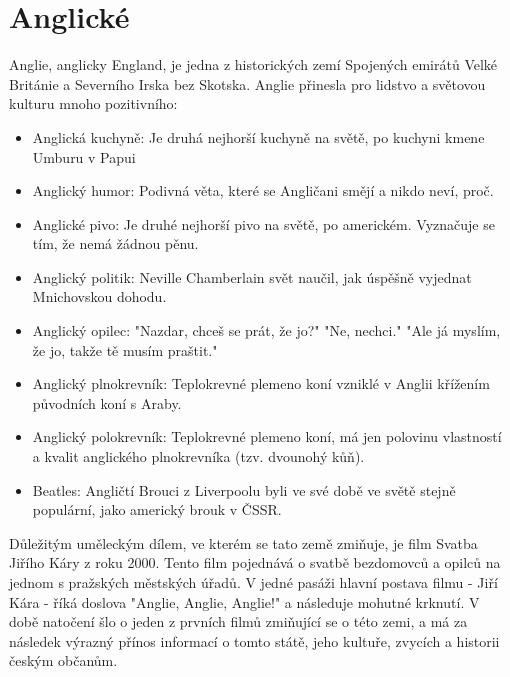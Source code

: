\documentclass[10.5pt]{book}
\begin{document}
\section{Anglické}

Anglie, anglicky England, je jedna z historických zemí Spojených emirátů Velké
Británie a Severního Irska bez Skotska. Anglie přinesla pro lidstvo a světovou
kulturu mnoho pozitivního: 
\begin{itemize}
	\item Anglická kuchyně: Je druhá nejhorší kuchyně na světě, po kuchyni kmene
	Umburu v Papui
	\item Anglický humor: Podivná věta, které se Angličani smějí a nikdo neví,
	proč. 
	\item Anglické pivo: Je druhé nejhorší pivo na světě, po americkém. Vyznačuje
	se tím, že nemá žádnou pěnu. 
	\item Anglický politik: Neville Chamberlain svět naučil, jak úspěšně vyjednat
	Mnichovskou dohodu. 
	\item Anglický opilec: "Nazdar, chceš se prát, že jo?" "Ne, nechci."
	"Ale já myslím, že jo, takže tě musím praštit."
	\item Anglický plnokrevník: Teplokrevné plemeno koní vzniklé v Anglii křížením
	původních koní s Araby. 
	\item Anglický polokrevník: Teplokrevné plemeno koní, má jen polovinu
	vlastností a kvalit anglického plnokrevníka (tzv. dvounohý kůň).
	\item Beatles: Angličtí Brouci z Liverpoolu byli ve své době ve světě stejně
	populární, jako americký brouk v ČSSR. 
\end{itemize}

Důležitým uměleckým dílem, ve kterém se tato země zmiňuje, je film Svatba
Jiřího Káry z roku 2000. Tento film pojednává o svatbě bezdomovců a opilců na
jednom s pražských městských úřadů. V jedné pasáži hlavní postava filmu - Jiří
Kára - říká doslova "Anglie, Anglie, Anglie!" a následuje mohutné krknutí.
V době natočení šlo o jeden z prvních filmů zmiňující se o této zemi, a má za
následek výrazný přínos informací o tomto státě, jeho kultuře, zvycích
a historii českým občanům. 

\newpage
\thispagestyle{empty}

\end{document}
